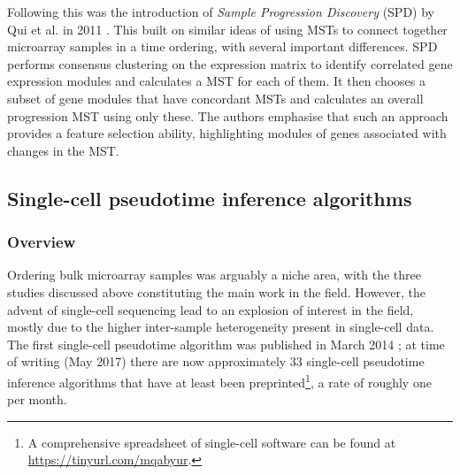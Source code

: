 Following this was the introduction of \emph{Sample Progression Discovery} (SPD) by Qui et al. in 2011 \cite{Qiu2011-ol}. This built on similar ideas of using MSTs to connect together microarray samples in a time ordering, with several important differences. SPD performs consensus clustering on the expression matrix to identify correlated gene expression modules and calculates a MST for each of them. It then chooses a subset of gene modules that have concordant MSTs and calculates an overall progression MST using only these. The authors emphasise that such an approach provides a feature selection ability, highlighting modules of genes associated with changes in the MST.



\subsection{Single-cell pseudotime inference algorithms}

\subsubsection{Overview}

Ordering bulk microarray samples was arguably a niche area, with the three studies discussed above constituting the main work in the field. However, the advent of single-cell sequencing lead to an explosion of interest in the field, mostly due to the higher inter-sample heterogeneity present in single-cell data. The first single-cell pseudotime algorithm was published in March 2014 \cite{trapnell2014dynamics}; at time of writing (May 2017) there are now approximately 33 single-cell pseudotime inference algorithms that have at least been preprinted\footnote{
A comprehensive spreadsheet of single-cell software can be found at \url{https://tinyurl.com/mqabyur}.
}, a rate of roughly one per month.

